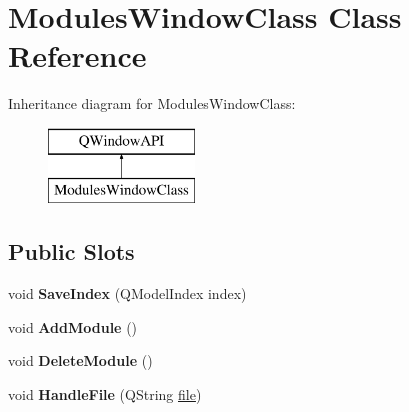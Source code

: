 \hypertarget{class_modules_window_class}{
\section{ModulesWindowClass Class Reference}
\label{class_modules_window_class}
}
Inheritance diagram for ModulesWindowClass:\begin{figure}[H]
\begin{center}
\leavevmode
\includegraphics[height=2.000000cm]{class_modules_window_class}
\end{center}
\end{figure}
\subsection*{Public Slots}
\begin{DoxyCompactItemize}
\item 
\hypertarget{class_modules_window_class_a407ecce7f578aa4b183093779517ecd0}{
void {\bfseries SaveIndex} (QModelIndex index)}
\label{class_modules_window_class_a407ecce7f578aa4b183093779517ecd0}

\item 
\hypertarget{class_modules_window_class_a8617df7392acea1c11e1124e27621290}{
void {\bfseries AddModule} ()}
\label{class_modules_window_class_a8617df7392acea1c11e1124e27621290}

\item 
\hypertarget{class_modules_window_class_a21e1219a34cd23bb3932d6863aec17b0}{
void {\bfseries DeleteModule} ()}
\label{class_modules_window_class_a21e1219a34cd23bb3932d6863aec17b0}

\item 
\hypertarget{class_modules_window_class_ae23d0ad58531e4175e90c00d150803cf}{
void {\bfseries HandleFile} (QString \hyperlink{structfile}{file})}
\label{class_modules_window_class_ae23d0ad58531e4175e90c00d150803cf}

\end{DoxyCompactItemize}
